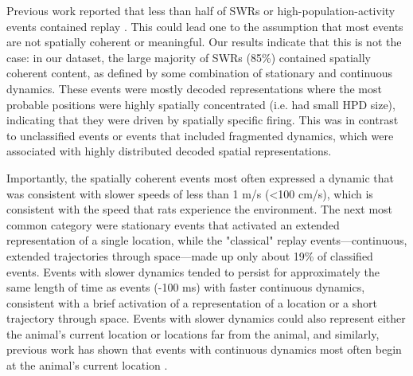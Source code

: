\documentclass[9pt,lineno]{elife}
\begin{document}
Previous work reported that less than half of SWRs or high-population-activity events contained replay \citep{KarlssonAwakereplayremote2009, FosterReversereplaybehavioural2006, DavidsonHippocampalReplayExtended2009}. This could lead one to the assumption that most events are not spatially coherent or meaningful. Our results indicate that this is not the case: in our dataset, the large majority of SWRs (85\%) contained spatially coherent content, as defined by some combination of stationary and continuous dynamics. These events were mostly decoded representations where the most probable positions were highly spatially concentrated (i.e. had small HPD size), indicating that they were driven by spatially specific firing. This was in contrast to unclassified events or events that included fragmented dynamics, which were associated with highly distributed decoded spatial representations. 

Importantly, the spatially coherent events most often expressed a dynamic that was consistent with slower speeds of less than 1 m/s (<100 cm/s), which is consistent with the speed that rats experience the environment. The next most common category were stationary events \citep{YuDistincthippocampalcorticalmemory2017, FarooqEmergencepreconfiguredplastic2019} that activated an extended representation of a single location, while the "classical" replay events---continuous, extended trajectories through space---made up only about 19\% of classified events. Events with slower dynamics tended to persist for approximately the same length of time as events (-100 ms) with faster continuous dynamics, consistent with a brief activation of a representation of a location or a short trajectory through space. Events with slower dynamics could also represent either the animal's current location or locations far from the animal, and similarly, previous work has shown that events with continuous dynamics most often begin at the animal's current location \citep{DavidsonHippocampalReplayExtended2009, KarlssonAwakereplayremote2009}.
\end{document}
